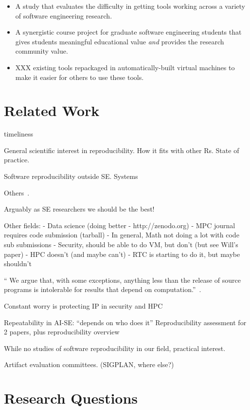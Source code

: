 \documentclass{sig-alternate-05-2015}
\begin{document}
\begin{itemize}
  \item A study that evaluates the difficulty in getting tools 
  		working across a variety of software engineering research.
  \item A synergistic course project for graduate software engineering students 
		that gives students meaningful educational value \emph{and}
		provides the research community value.
  \item XXX existing tools repackaged in automatically-built virtual machines
  		to make it easier for others to use these tools.
\end{itemize}

\section{Related Work}

timeliness

General scientific interest in reproducibility.
How it fits with other Rs.
State of practice.

Software reproducibility outside SE.
Systems~\cite{collberg2016repeatability,proebsting2015repeatability}

Others~\cite{kovacevic2007encourage,vandewalle2009reproducible,stodden2009enabling,klein2012run}.


Arguably as SE researchers we should be the best!

Other fields:
- Data science (doing better - http://zenodo.org)
- MPC journal requires code submission (tarball)
- In general, Math not doing a lot with code sub submissions
- Security, should be able to do VM, but don't (but see Will's paper)
- HPC doesn't (and maybe can't)
- RTC is starting to do it, but maybe shouldn't

`` We argue that, with some exceptions, anything less than the release of source programs is intolerable for results that depend on computation.''~\cite{ince2012case}.

Constant worry is protecting IP in security and HPC

Repeatability in AI-SE: ``depends on who does it''
Reproducibility assessment for 2 papers, plus reproducibility overview~\cite{gonzalez2012reproducibility}


While no studies of software reproducibility in our field,
practical interest.

Artifact evaluation committees. (SIGPLAN, where else?)


\section{Research Questions}
\end{document}
